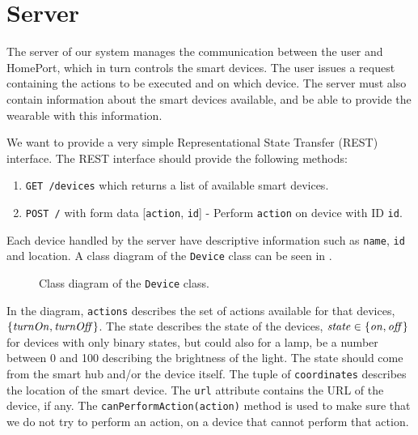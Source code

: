 \section{Server}\label{sec:serverdesign}
The server of our system manages the communication between the user and HomePort, 
which in turn controls the smart devices.
The user issues a request containing the actions to be executed and on which device. 
The server must also contain information about the smart devices available,
and be able to provide the wearable with this information. 

We want to provide a very simple Representational State Transfer (REST) interface.
The REST interface should provide the following methods:

\begin{enumerate}
  \item \texttt{GET /devices} which returns a list of available smart devices.
  \item \texttt{POST /} with form data [\texttt{action}, \texttt{id}] - Perform \texttt{action} on device with ID \texttt{id}.
\end{enumerate}

Each device handled by the server have descriptive information such as \texttt{name}, \texttt{id} and location. 
A class diagram of the \texttt{Device} class can be seen in .

\begin{figure}[!htb]
  \centering
  \label{fig:deviceclass}
  \caption{Class diagram of the \texttt{Device} class.}
\end{figure}

In the diagram, \texttt{actions} describes the set of actions available for that devices, \eg $\{\var{turnOn}, \var{turnOff}\}$. 
The state describes the state of the devices, 
\eg $\var{state} \in \{\var{on}, \var{off}\}$ for devices with only binary states, 
but could also for a lamp, be a number between \num{0} and \num{100} describing the brightness of the light. 
The state should come from the smart hub and/or the device itself. 
The tuple of \texttt{coordinates} describes the location of the smart device. 
The \texttt{url} attribute contains the URL of the device, if any. 
The \texttt{canPerformAction(action)} method is used to make sure that we do not try to perform an action, 
on a device that cannot perform that action. 

